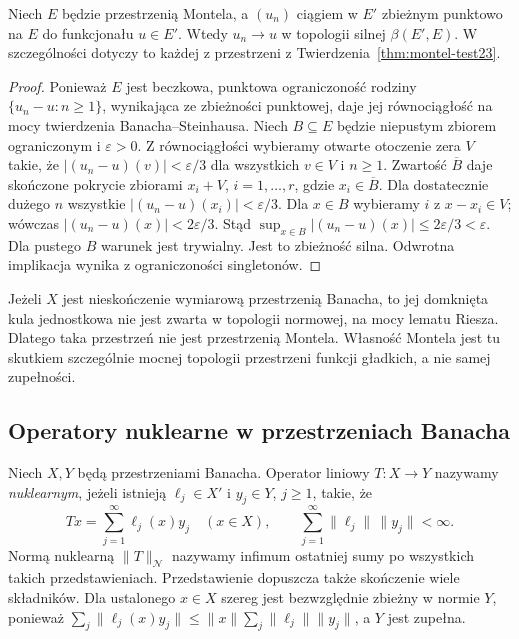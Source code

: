 \begin{wniosek}
\label{cor:montel-dual-seq23}
Niech $E$ będzie przestrzenią Montela, a $(u_n)$ ciągiem w
$E'$ zbieżnym punktowo na $E$ do funkcjonału $u\in E'$.
Wtedy $u_n\to u$ w topologii silnej $\beta(E',E)$.
W szczególności dotyczy to każdej z przestrzeni
z Twierdzenia~\ref{thm:montel-test23}.
\end{wniosek}
\begin{proof}
Ponieważ $E$ jest beczkowa, punktowa ograniczoność
rodziny $\{u_n-u:n\ge1\}$, wynikająca ze zbieżności
punktowej, daje jej równociągłość na mocy twierdzenia
Banacha--Steinhausa. Niech $B\subseteq E$ będzie
niepustym zbiorem ograniczonym i $\varepsilon>0$.
Z równociągłości wybieramy otwarte otoczenie zera $V$
takie, że $|(u_n-u)(v)|<\varepsilon/3$ dla wszystkich
$v\in V$ i $n\ge1$. Zwartość $\overline B$ daje
skończone pokrycie zbiorami $x_i+V$,
$i=1,\ldots,r$, gdzie $x_i\in\overline B$.
Dla dostatecznie dużego $n$ wszystkie
$|(u_n-u)(x_i)|<\varepsilon/3$. Dla $x\in B$
wybieramy $i$ z $x-x_i\in V$; wówczas
$|(u_n-u)(x)|<2\varepsilon/3$.
Stąd $\sup_{x\in B}|(u_n-u)(x)|\le2\varepsilon/3
<\varepsilon$. Dla pustego $B$ warunek jest trywialny.
Jest to zbieżność silna. Odwrotna implikacja wynika
z ograniczoności singletonów.
\end{proof}

\begin{przyklad}
\label{ex:banach-not-montel23}
Jeżeli $X$ jest nieskończenie wymiarową przestrzenią Banacha,
to jej domknięta kula jednostkowa nie jest zwarta w topologii
normowej, na mocy lematu Riesza. Dlatego taka przestrzeń
nie jest przestrzenią Montela. Własność Montela
jest tu skutkiem szczególnie mocnej topologii przestrzeni
funkcji gładkich, a nie samej zupełności.
\end{przyklad}

\subsection{Operatory nuklearne w przestrzeniach Banacha}

\begin{definicja}
\label{def:nuclear-banach23}
Niech $X,Y$ będą przestrzeniami Banacha. Operator liniowy
$T:X\to Y$ nazywamy \emph{nuklearnym}, jeżeli istnieją
$\ell_j\in X'$ i $y_j\in Y$, $j\ge1$, takie, że
\[
 Tx=\sum_{j=1}^\infty \ell_j(x)y_j\quad(x\in X),
 \qquad \sum_{j=1}^\infty\|\ell_j\|\,\|y_j\|<\infty.
\]
Normą nuklearną $\|T\|_{\mathcal N}$ nazywamy infimum
ostatniej sumy po wszystkich takich przedstawieniach.
Przedstawienie dopuszcza także skończenie wiele składników.
Dla ustalonego $x\in X$ szereg jest bezwzględnie
zbieżny w normie $Y$, ponieważ
$\sum_j\|\ell_j(x)y_j\|\le\|x\|\sum_j\|\ell_j\|\|y_j\|$,
a $Y$ jest zupełna.
\end{definicja}

